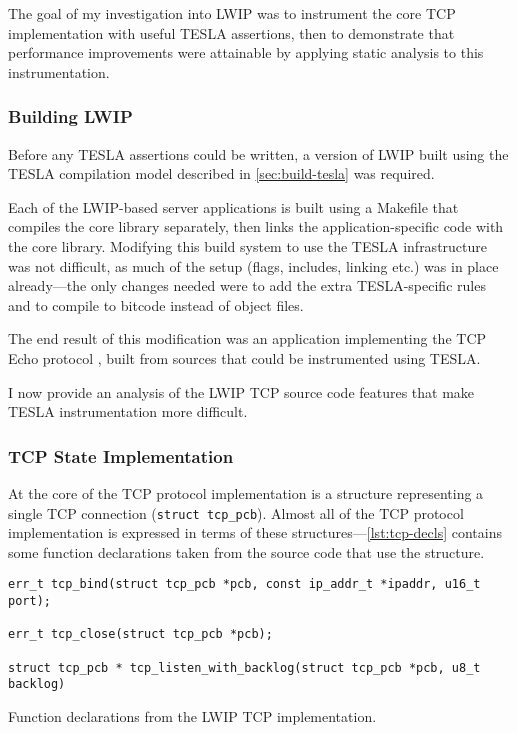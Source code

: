 The goal of my investigation into LWIP was to instrument the core TCP
implementation with useful TESLA assertions, then to demonstrate that
performance improvements were attainable by applying static analysis to
this instrumentation.

\subsubsection{Building LWIP}

Before any TESLA assertions could be written, a version of LWIP built
using the TESLA compilation model described in \autoref{sec:build-tesla}
was required.

Each of the LWIP-based server applications is built using a Makefile
that compiles the core library separately, then links the
application-specific code with the core library. Modifying this build
system to use the TESLA infrastructure was not difficult, as much of the
setup (flags, includes, linking etc.) was in place already---the only
changes needed were to add the extra TESLA-specific rules and to compile
to bitcode instead of object files.

The end result of this modification was an application implementing the
TCP Echo protocol \cite{RFC0862}, built from sources that could be
instrumented using TESLA.

I now provide an analysis of the LWIP TCP source code features that make
TESLA instrumentation more difficult.

\subsubsection{TCP State Implementation}

At the core of the TCP protocol implementation is a structure
representing a single TCP connection (\texttt{struct tcp_pcb}).
Almost all of the TCP protocol implementation is expressed in terms of
these structures---\autoref{lst:tcp-decls} contains some function
declarations taken from the source code that use the structure.

\begin{listing}
  \begin{verbatim}
err_t tcp_bind(struct tcp_pcb *pcb, const ip_addr_t *ipaddr, u16_t port);

err_t tcp_close(struct tcp_pcb *pcb);

struct tcp_pcb * tcp_listen_with_backlog(struct tcp_pcb *pcb, u8_t backlog)
  \end{verbatim}
  \caption{Function declarations from the LWIP TCP implementation.}
  \label{lst:tcp-decls}
\end{listing}

